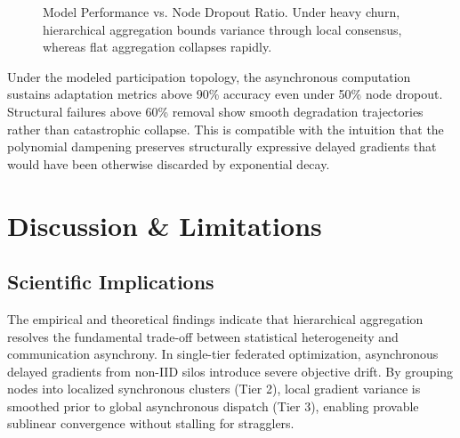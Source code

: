 \documentclass[conference]{IEEEtran}
\begin{document}
\begin{figure}[htbp]
\centering
{}
\caption{Model Performance vs. Node Dropout Ratio. Under heavy churn, hierarchical aggregation bounds variance through local consensus, whereas flat aggregation collapses rapidly.}
\label{fig:dropout_resilience}
\end{figure}

Under the modeled participation topology, the asynchronous computation sustains adaptation metrics above 90\% accuracy even under 50\% node dropout. Structural failures above 60\% removal show smooth degradation trajectories rather than catastrophic collapse. This is compatible with the intuition that the polynomial dampening preserves structurally expressive delayed gradients that would have been otherwise discarded by exponential decay.

\section{Discussion \& Limitations}

\subsection{Scientific Implications}
The empirical and theoretical findings indicate that hierarchical aggregation resolves the fundamental trade-off between statistical heterogeneity and communication asynchrony. In single-tier federated optimization, asynchronous delayed gradients from non-IID silos introduce severe objective drift. By grouping nodes into localized synchronous clusters (Tier 2), local gradient variance is smoothed prior to global asynchronous dispatch (Tier 3), enabling provable sublinear convergence without stalling for stragglers.
\end{document}
